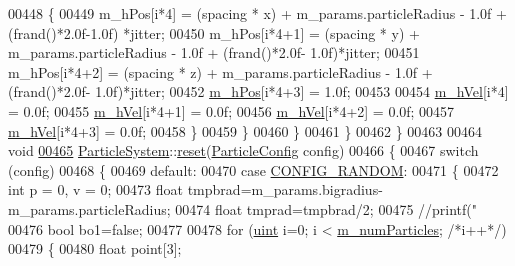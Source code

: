 \begin{DoxyCode}
{{{{{00448                 \{
00449                     m\_hPos[i*4] = (spacing * x) + m\_params.particleRadius - 1.0f + (frand()*2.0f-1.0f)
      *jitter;
00450                     m\_hPos[i*4+1] = (spacing * y) + m\_params.particleRadius - 1.0f + (frand()*2.0f-
      1.0f)*jitter;
00451                     m\_hPos[i*4+2] = (spacing * z) + m\_params.particleRadius - 1.0f + (frand()*2.0f-
      1.0f)*jitter;
00452                     \hyperlink{class_particle_system_ab9d75471d2eaaeb8fa98d2f3f47d9c25}{m\_hPos}[i*4+3] = 1.0f;
00453 
00454                     \hyperlink{class_particle_system_a20560c896ee8a8bbc827a8e5902da7e2}{m\_hVel}[i*4] = 0.0f;
00455                     \hyperlink{class_particle_system_a20560c896ee8a8bbc827a8e5902da7e2}{m\_hVel}[i*4+1] = 0.0f;
00456                     \hyperlink{class_particle_system_a20560c896ee8a8bbc827a8e5902da7e2}{m\_hVel}[i*4+2] = 0.0f;
00457                     \hyperlink{class_particle_system_a20560c896ee8a8bbc827a8e5902da7e2}{m\_hVel}[i*4+3] = 0.0f;
00458                 \}
00459             \}
00460         \}
00461     \}
00462 \}
00463 
00464 \textcolor{keywordtype}{void}
\hypertarget{particle_system_8cpp_source_l00465}{}\hyperlink{class_particle_system_a519070812dd9eb349f270c793c5f64b6}{00465} \hyperlink{class_particle_system}{ParticleSystem}::\hyperlink{class_particle_system_a519070812dd9eb349f270c793c5f64b6}{reset}(\hyperlink{class_particle_system_a1dca3996c8068602412ef9f7826605d1}{ParticleConfig} config)
00466 \{
00467     \textcolor{keywordflow}{switch} (config)
00468     \{
00469         \textcolor{keywordflow}{default}:
00470         \textcolor{keywordflow}{case} \hyperlink{class_particle_system_a1dca3996c8068602412ef9f7826605d1a053c69e4e6b094605ea152a644e7c9ee}{CONFIG\_RANDOM}:
00471             \{
00472                 \textcolor{keywordtype}{int} p = 0, v = 0;
00473                                 \textcolor{keywordtype}{float} tmpbrad=m\_params.bigradius-m\_params.particleRadius;
00474                                 \textcolor{keywordtype}{float} tmprad=tmpbrad/2;
00475                                 \textcolor{comment}{//printf("%
00476                                 \textcolor{keywordtype}{bool} bo1=\textcolor{keyword}{false};
00477 
00478                 \textcolor{keywordflow}{for} (\hyperlink{particles__kernel_8cuh_a91ad9478d81a7aaf2593e8d9c3d06a14}{uint} i=0; i < \hyperlink{class_particle_system_a23d238efa80a647d4b6cde034f486a91}{m\_numParticles}; \textcolor{comment}{/*i++*/})
00479                 \{
00480                     \textcolor{keywordtype}{float} point[3];
}}}}}}
\end{DoxyCode}
